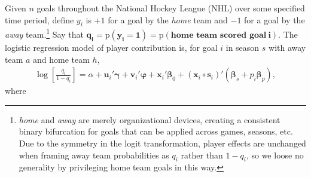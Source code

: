 Given $n$ goals throughout the National Hockey League (NHL) over some
specified time period, define $y_i$ is $+1$ for a goal by the \textit{home} team
and $-1$ for a goal by the \textit{away} team.\footnote{{\em home} and {\em
away} are merely organizational devices, creating a consistent binary
bifurcation for goals that can be applied across games, seasons, etc. Due to
the symmetry in the logit transformation, player effects are unchanged when
framing away team probabilities as $q_i$ rather than $1-q_i$, so we loose no
generality by privileging home team goals in this way.}  Say that $\boldsymbol{q_i =
\mathrm{p}(y_i = 1) =  \mathrm{p}(\textbf{home~team~scored~goal}~i)}$.  The
logistic regression model of player contribution is, for goal $i$ in season
$s$ with away team $a$ and home team $h$,  
\begin{align}\label{hockeymod}
\log\left[\frac{q_{i}}{1-q_{i}}\right] = \alpha + \mathbf{u}_i'\boldsymbol{\gamma} +
\mathbf{v}_i'\boldsymbol{\varphi} + \mathbf{x}_i'\boldsymbol{\beta}_0 +
(\mathbf{x}_i\circ\mathbf{s}_i)'(\boldsymbol{\beta}_s + p_i \boldsymbol{\beta}_{p}), 
\end{align}  
where
